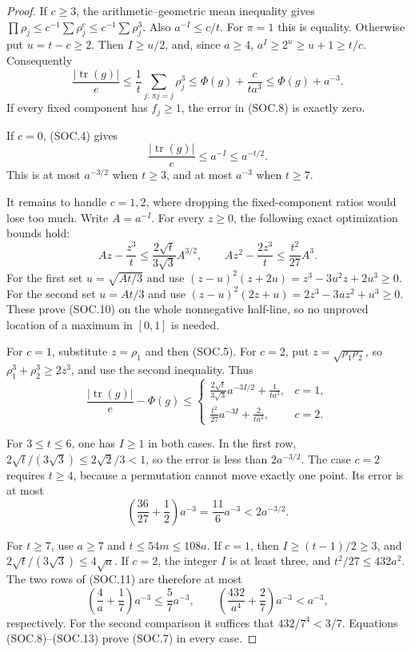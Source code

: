 \begin{proof}
If \(c\ge3\), the arithmetic--geometric mean inequality gives
\(\prod\rho_j\le c^{-1}\sum\rho_j^c\le c^{-1}\sum\rho_j^3\).
Also \(a^{-I}\le c/t\). For \(\pi=1\) this is equality.
Otherwise put \(u=t-c\ge2\). Then
\(I\ge u/2\), and, since \(a\ge4\),
\(a^I\ge2^u\ge u+1\ge t/c\).
Consequently
\[
 \frac{|\operatorname{tr}(g)|}{e}
     \le\frac1t\sum_{j:\,\pi j=j}\rho_j^3
     \le\Phi(g)+\frac{c}{t a^3}\le\Phi(g)+a^{-3}.
 \tag{SOC.8}
\]
If every fixed component has \(f_j\ge1\), the error in (SOC.8)
is exactly zero.

If \(c=0\), (SOC.4) gives
\[
       \frac{|\operatorname{tr}(g)|}{e}\le a^{-I}
                         \le a^{-t/2}.
 \tag{SOC.9}
\]
This is at most \(a^{-3/2}\) when \(t\ge3\), and at most \(a^{-3}\)
when \(t\ge7\).

It remains to handle \(c=1,2\), where dropping the fixed-component
ratios would lose too much. Write \(A=a^{-I}\).
For every \(z\ge0\), the following exact optimization bounds hold:
\[
 Az-\frac{z^3}{t}
       \le\frac{2\sqrt t}{3\sqrt3}A^{3/2},\qquad
 Az^2-\frac{2z^3}{t}
       \le\frac{t^2}{27}A^3.
 \tag{SOC.10}
\]
For the first set \(u=\sqrt{At/3}\) and use
\((z-u)^2(z+2u)=z^3-3u^2z+2u^3\ge0\).
For the second set \(u=At/3\) and use
\((z-u)^2(2z+u)=2z^3-3uz^2+u^3\ge0\).
These prove (SOC.10) on the whole nonnegative half-line, so no
unproved location of a maximum in \([0,1]\) is needed.

For \(c=1\), substitute \(z=\rho_1\) and then (SOC.5).
For \(c=2\), put \(z=\sqrt{\rho_1\rho_2}\), so
\(\rho_1^3+\rho_2^3\ge2z^3\), and use the second inequality.
Thus
\[
 \frac{|\operatorname{tr}(g)|}{e}-\Phi(g)
 \le
 \begin{cases}
 \displaystyle\frac{2\sqrt t}{3\sqrt3}a^{-3I/2}
                            +\frac1{t a^3},&c=1,\\[4pt]
 \displaystyle\frac{t^2}{27}a^{-3I}
                            +\frac2{t a^3},&c=2.
 \end{cases}
 \tag{SOC.11}
\]

For \(3\le t\le6\), one has \(I\ge1\) in both cases.
In the first row, \(2\sqrt t/(3\sqrt3)\le2\sqrt2/3<1\),
so the error is less than \(2a^{-3/2}\).
The case \(c=2\) requires \(t\ge4\), because a permutation cannot
move exactly one point. Its error is at most
\[
          \left(\frac{36}{27}+\frac12\right)a^{-3}
                    =\frac{11}{6}a^{-3}<2a^{-3/2}.
 \tag{SOC.12}
\]

For \(t\ge7\), use \(a\ge7\) and \(t\le54m\le108a\).
If \(c=1\), then \(I\ge(t-1)/2\ge3\), and
\(2\sqrt t/(3\sqrt3)\le4\sqrt a\).
If \(c=2\), the integer \(I\) is at least three, and
\(t^2/27\le432a^2\).
The two rows of (SOC.11) are therefore at most
\[
 \left(\frac4a+\frac17\right)a^{-3}\le\frac57a^{-3},
 \qquad
 \left(\frac{432}{a^4}+\frac27\right)a^{-3}<a^{-3},
 \tag{SOC.13}
\]
respectively. For the second comparison it suffices that
\(432/7^4<3/7\).
Equations (SOC.8)--(SOC.13) prove (SOC.7) in every case.


\end{proof}
